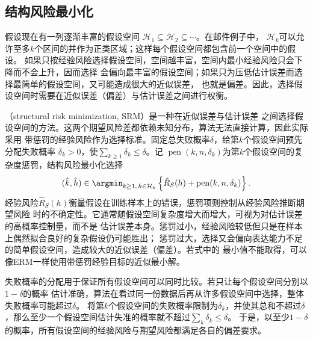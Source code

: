 \subsection{结构风险最小化}

假设现在有一列逐渐丰富的假设空间
$\mathcal H_1\subseteq\mathcal H_2\subseteq\cdots$。在邮件例子中，
$\mathcal H_k$可以允许至多$k$个区间的并作为正类区域；这样每个假设空间都包含前一个空间中的假设。
如果只按经验风险选择假设空间，空间越丰富，空间内最小经验风险只会下降而不会上升，因而选择
会偏向最丰富的假设空间；如果只为压低估计误差而选择最简单的假设空间，又可能造成很大的近似误差，
也就是偏差。因此，选择假设空间时需要在近似误差（偏差）与估计误差之间进行权衡。

（structural risk minimization, SRM）是一种在近似误差与估计误差
之间选择假设空间的方法。这两个期望风险差都依赖未知分布，算法无法直接计算，因此实际采用
带惩罚的经验风险作为选择标准。固定总失败概率$\delta$，给第$k$个假设空间预先分配失败概率
$\delta_k>0$，使$\sum_{k\geq1}\delta_k\leq\delta$。记
$\operatorname{pen}(k,n,\delta_k)$为第$k$个假设空间的复杂度惩罚，结构风险最小化选择
\begin{equation}
  (\hat k,\hat h)
  \in\argmin_{k\geq1,\,h\in\mathcal H_k}
  \left\{\hat R_S(h)+\operatorname{pen}(k,n,\delta_k)\right\}.
  \label{eq:structural-risk-minimization}
\end{equation}
经验风险$\hat R_S(h)$衡量假设在训练样本上的错误，惩罚项则控制从经验风险推断期望风险
时的不确定性。它通常随假设空间复杂度增大而增大，可视为对估计误差的高概率控制量，而不是
估计误差本身。惩罚过小，经验风险较低但只是在样本上偶然拟合良好的复杂假设仍可能胜出；
惩罚过大，选择又会偏向表达能力不足的简单假设空间，造成较大的近似误差（偏差）。若式中的
最小值不能取得，可以像ERM一样使用带惩罚经验目标的近似最小解。

失败概率的分配用于保证所有假设空间可以同时比较。若只让每个假设空间分别以$1-\delta$的概率
估计准确，算法在看过同一份数据后再从许多假设空间中选择，整体失败概率可能超过$\delta$。
将第$k$个假设空间的失败概率限制为$\delta_k$，并使其总和不超过$\delta$，那么至少一个假设空间估计失准的概率就不超过$\sum_k\delta_k\leq\delta$。
于是，以至少$1-\delta$的概率，所有假设空间的经验风险与期望风险都满足各自的偏差要求。

